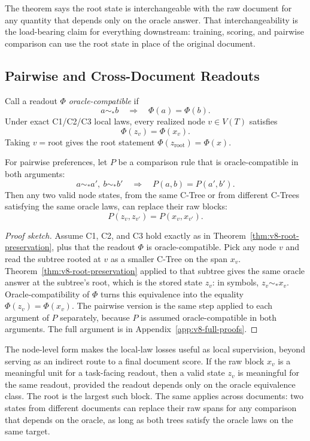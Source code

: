 The theorem says the root state is interchangeable with the raw
document for any quantity that depends only on the oracle answer.
That interchangeability is the load-bearing claim for everything
downstream: training, scoring, and pairwise comparison can use the
root state in place of the original document.

\subsection{Pairwise and Cross-Document Readouts}

\begin{corollary}
\label{cor:v8-preferences-pass-to-root}
Call a readout \(\Phi\) \emph{oracle-compatible} if
\[
  a\sim_\ast b \quad\Longrightarrow\quad \Phi(a)=\Phi(b).
\]
Under exact C1/C2/C3 local laws, every realized node \(v\in V(T)\) satisfies
\[
  \Phi(z_v)=\Phi(x_v).
\]
Taking \(v=\mathrm{root}\) gives the root statement
\(\Phi(z_{\mathrm{root}})=\Phi(x)\).

For pairwise preferences, let \(P\) be a comparison rule that is
oracle-compatible in both arguments:
\[
  a\sim_\ast a',\ b\sim_\ast b'
  \quad\Longrightarrow\quad
  P(a,b)=P(a',b').
\]
Then any two valid node states, from the same C-Tree or from different
C-Trees satisfying the same oracle laws, can replace their raw blocks:
\[
  P(z_v,z_{v'})=P(x_v,x_{v'}).
\]
\end{corollary}

\begin{proof}[Proof sketch]
Assume C1, C2, and C3 hold exactly as in
Theorem~\ref{thm:v8-root-preservation}, plus that the readout
\(\Phi\) is oracle-compatible. Pick any node \(v\) and read the
subtree rooted at \(v\) as a smaller C-Tree on the span \(x_v\).
Theorem~\ref{thm:v8-root-preservation} applied to that subtree gives
the same oracle answer at the subtree's root, which is the stored
state \(z_v\): in symbols, \(z_v\sim_\ast x_v\). Oracle-compatibility
of \(\Phi\) turns this equivalence into the equality
\(\Phi(z_v)=\Phi(x_v)\). The pairwise version is the same step
applied to each argument of \(P\) separately, because \(P\) is
assumed oracle-compatible in both arguments. The full argument is in
Appendix~\ref{app:v8-full-proofs}.
\end{proof}

The node-level form makes the local-law losses useful as local
supervision, beyond serving as an indirect route to a final document
score. If the raw block \(x_v\) is a meaningful unit for a
task-facing readout, then a valid state \(z_v\) is meaningful for
the same readout, provided the readout depends only on the oracle
equivalence class. The root is the largest such block. The same
applies across documents: two states from different documents can
replace their raw spans for any comparison that depends on the
oracle, as long as both trees satisfy the oracle laws on the same
target.

